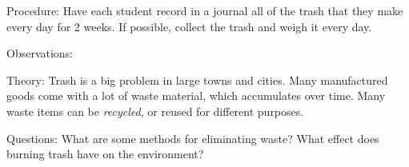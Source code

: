 \begin{multicols}{2}

\begin{description*}
\item[Procedure:]{Have each student record in a journal all of the trash that they make every day for 2 weeks. If possible, collect the trash and weigh it every day.}
\item[Observations:]{}
\item[Theory:]{Trash is a big problem in large towns and cities. Many manufactured goods come with a lot of waste material, which accumulates over time. Many waste items can be \emph{recycled}, or reused for different purposes.}
\item[Questions:]{What are some methods for eliminating waste? What effect does burning trash have on the environment?}
\end{description*}



\end{multicols}
\vfill
\pagebreak